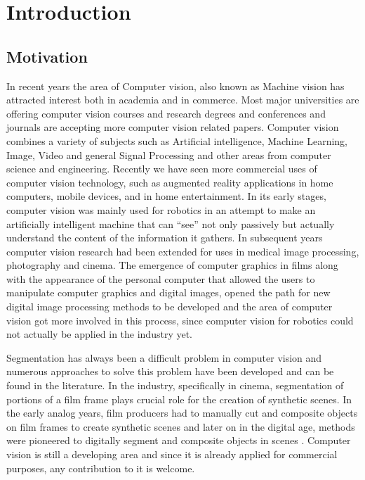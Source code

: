 \chapter{Introduction}
\label{chap:intro}

\section{Motivation}
\label{sec:motivation}

In recent years the area of Computer vision, also known as Machine vision has attracted interest both in academia and in commerce. Most major universities are offering computer vision courses and research degrees and conferences and journals are accepting more computer vision related papers. Computer vision combines a variety of subjects such as Artificial intelligence, Machine Learning, Image, Video and general Signal Processing and other areas from computer science and engineering. Recently we have seen more commercial uses of computer vision technology, such as augmented reality applications in home computers, mobile devices, and in home entertainment. In its early stages, computer vision was mainly used for robotics in an attempt to make an artificially intelligent machine that can “see” not only passively but actually understand the content of the information it gathers. In subsequent years computer vision research had been extended for uses in medical image processing, photography and cinema. The emergence of computer graphics in films along with the appearance of the personal computer that allowed the users to manipulate computer graphics and digital images, opened the path for new digital image processing methods to be developed and the area of computer vision got more involved in this process, since computer vision for robotics could not actually be applied in the industry yet. 
\par
Segmentation has always been a difficult problem in computer vision and numerous approaches to solve this problem have been developed and can be found in the literature. In the industry, specifically in cinema, segmentation of portions of a film frame plays crucial role for the creation of synthetic scenes. In the early analog years, film producers had to manually cut and composite objects on film frames to create synthetic scenes and later on in the digital age, methods were pioneered to digitally segment and composite objects in scenes \cite{compositing}. Computer vision is still a developing area and since it is already applied for commercial purposes, any contribution to it is welcome.

